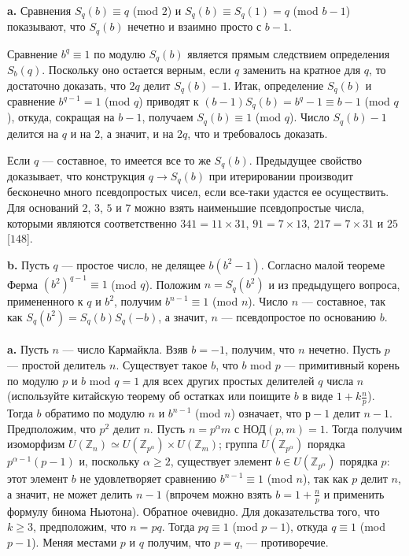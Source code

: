 \documentclass{mai_book}
\begin{document}
 \\

\textbf{a. } Сравнения $S_q(b) \equiv q$ (mod $2$) и $S_q(b) \equiv S_q(1) = q $ (mod $b-1$) 
показывают, что $S_q(b)$ нечетно и взаимно просто с $b-1$. \par
Сравнение $b^q \equiv 1$ по модулю $S_q(b)$ является прямым следствием определения $S_b(q)$. Поскольку оно остается верным, если $q$ заменить на кратное для $q$, то достаточно доказать, что $2q$ делит $S_q(b)-1$. Итак, определение $S_q(b)$ и сравнение $b^{q-1} = 1$ (mod $q$) приводят к $(b-1)S_q(b) = b^q -1 \equiv b-1$ (mod $q$), откуда, сокращая на $b-1$,  получаем $S_q(b) \equiv 1$ (mod $q$). Число $S_q(b)-1$ делится на $q$ и на 2, а значит, и на $2q$, что и требовалось доказать. \par 
Если $q$ --- составное, то имеется все то же $S_q(b)$. Предыдущее  свойство доказывает, что конструкция $q \to S_q(b)$ при итерировании  производит бесконечно много псевдопростых чисел, если все-таки удастся ее осуществить. Для оснований $2$, $3$, $5$ и $7$ можно взять наименьшие  псевдопростые числа, которыми являются соответственно $341 = 11 \times 31$, $91 = 7 \times 13$, $217 = 7 \times 31$ и $25$ [$148$]. \smallskip

\textbf{b. } Пусть $q$ --- простое число, не делящее $b(b^2 - 1)$. Согласно малой теореме Ферма $(b^2)^{q-1} \equiv 1$ (mod $q$). Положим $n = S_q(b^2)$ и из  предыдущего вопроса, примененного к $q$ и $b^2$, получим $b^{n-1} \equiv 1$ (mod $n$). Число $n$ --- составное, так как $S_q(b^2) = S_q(b)S_q(-b)$, а значит, $n$ —  псевдопростое по основанию $b$. \\

 \\ 

\textbf{a. } Пусть $n$ --- число Кармайкла. Взяв $b = -1$, получим, что $n$ нечетно. Пусть $p$ --- простой делитель $n$. Существует такое $b$, что $b$ mod $p$ --- примитивный корень по модулю $p$ и $b$ mod $q = 1$ для всех других  простых делителей $q$ числа $n$ (используйте китайскую теорему об  остатках или поищите $b$ в виде $1+k \frac{n}{p}$). Тогда $b$ обратимо по модулю $n$ и $b^{n-1}$ (mod $n$) означает, что $р - 1$ делит $n - 1$. Предположим, что $p^2$ делит $n$. Пусть $n = p^{\alpha}m$ с НОД$(p,m) = 1$. Тогда получим  изоморфизм $ U(\mathbb{Z}_n) \simeq U(\mathbb{Z}_{p^{\alpha}}) \times U(\mathbb{Z}_m)$; группа $U(\mathbb{Z}_{p^{\alpha}})$ порядка $p^{\alpha - 1}(p -1)$ и, поскольку $\alpha \ge 2$, существует элемент $b \in U(\mathbb{Z}_{p^{\alpha}})$ порядка $p$: этот элемент $b$ не удовлетворяет сравнению $b^{n-1} \equiv 1$ (mod $n$), так как $p$ делит $n$, а значит, не может делить $n-1$ (впрочем можно взять $b = 1 + \frac{n}{p}$ и применить формулу бинома Ньютона). Обратное очевидно. Для доказательства того, что $k \ge 3$, предположим, что $n = pq$. Тогда $pq \equiv 1$ (mod $p-1$), откуда $q \equiv 1$ (mod $p-1$). Меняя местами $p$ и $q$ получим, что $p = q$, --- противоречие.\\
\end{document}
